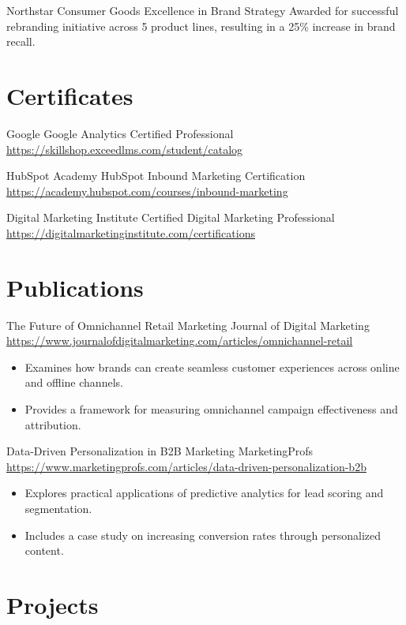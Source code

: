 \documentclass[a4paper, serif, 10pt]{moderncv}
\begin{document}
        {Northstar Consumer Goods}
        {Excellence in Brand Strategy}
        {}
        {}
        {Awarded for successful rebranding initiative across 5 product lines, resulting in a 25\% increase in brand recall.}
\section{Certificates}

        {Google}
        {Google Analytics Certified Professional}
        {\url{https://skillshop.exceedlms.com/student/catalog}}
        {}
        {}

        {HubSpot Academy}
        {HubSpot Inbound Marketing Certification}
        {\url{https://academy.hubspot.com/courses/inbound-marketing}}
        {}
        {}

        {Digital Marketing Institute}
        {Certified Digital Marketing Professional}
        {\url{https://digitalmarketinginstitute.com/certifications}}
        {}
        {}
\section{Publications}

        {The Future of Omnichannel Retail Marketing}
        {Journal of Digital Marketing}
        {\url{https://www.journalofdigitalmarketing.com/articles/omnichannel-retail}}
        {}
        {\begin{itemize}
\item Examines how brands can create seamless customer experiences across online and offline channels.
\item Provides a framework for measuring omnichannel campaign effectiveness and attribution.
\end{itemize}}

        {Data-Driven Personalization in B2B Marketing}
        {MarketingProfs}
        {\url{https://www.marketingprofs.com/articles/data-driven-personalization-b2b}}
        {}
        {\begin{itemize}
\item Explores practical applications of predictive analytics for lead scoring and segmentation.
\item Includes a case study on increasing conversion rates through personalized content.
\end{itemize}}
\section{Projects}
\end{document}
